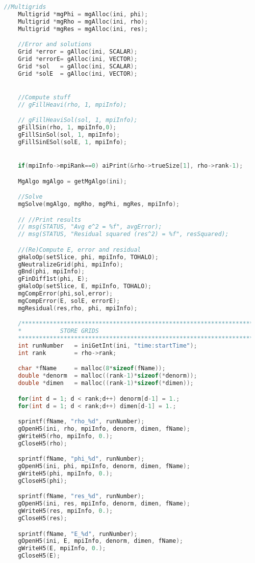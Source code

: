 \begin{lstlisting}[language=c, caption = main routine]
	//Multigrids
	Multigrid *mgPhi = mgAlloc(ini, phi);
	Multigrid *mgRho = mgAlloc(ini, rho);
	Multigrid *mgRes = mgAlloc(ini, res);

	//Error and solutions
	Grid *error = gAlloc(ini, SCALAR);
	Grid *errorE= gAlloc(ini, VECTOR);
	Grid *sol 	= gAlloc(ini, SCALAR);
	Grid *solE	= gAlloc(ini, VECTOR);


	//Compute stuff
	// gFillHeavi(rho, 1, mpiInfo);

	// gFillHeaviSol(sol, 1, mpiInfo);
	gFillSin(rho, 1, mpiInfo,0);
	gFillSinSol(sol, 1, mpiInfo);
	gFillSinESol(solE, 1, mpiInfo);


	if(mpiInfo->mpiRank==0)	aiPrint(&rho->trueSize[1], rho->rank-1);

	MgAlgo mgAlgo = getMgAlgo(ini);

	//Solve
	mgSolve(mgAlgo, mgRho, mgPhi, mgRes, mpiInfo);

	// //Print results
	// msg(STATUS, "Avg e^2 = %f", avgError);
	// msg(STATUS, "Residual squared (res^2) = %f", resSquared);

	//(Re)Compute E, error and residual
	gHaloOp(setSlice, phi, mpiInfo, TOHALO);
	gNeutralizeGrid(phi, mpiInfo);
	gBnd(phi, mpiInfo);
	gFinDiff1st(phi, E);
	gHaloOp(setSlice, E, mpiInfo, TOHALO);
	mgCompError(phi,sol,error);
	mgCompError(E, solE, errorE);
	mgResidual(res,rho, phi, mpiInfo);

	/*********************************************************************
	*			STORE GRIDS
	********************************************************************/
	int runNumber 	= iniGetInt(ini, "time:startTime");
	int rank 		= rho->rank;

	char *fName 	= malloc(8*sizeof(fName));
	double *denorm 	= malloc((rank-1)*sizeof(*denorm));
	double *dimen 	= malloc((rank-1)*sizeof(*dimen));

	for(int d = 1; d < rank;d++) denorm[d-1] = 1.;
	for(int d = 1; d < rank;d++) dimen[d-1] = 1.;

	sprintf(fName, "rho_%d", runNumber);
	gOpenH5(ini, rho, mpiInfo, denorm, dimen, fName);
	gWriteH5(rho, mpiInfo, 0.);
	gCloseH5(rho);

	sprintf(fName, "phi_%d", runNumber);
	gOpenH5(ini, phi, mpiInfo, denorm, dimen, fName);
	gWriteH5(phi, mpiInfo, 0.);
	gCloseH5(phi);

	sprintf(fName, "res_%d", runNumber);
	gOpenH5(ini, res, mpiInfo, denorm, dimen, fName);
	gWriteH5(res, mpiInfo, 0.);
	gCloseH5(res);

	sprintf(fName, "E_%d", runNumber);
	gOpenH5(ini, E, mpiInfo, denorm, dimen, fName);
	gWriteH5(E, mpiInfo, 0.);
	gCloseH5(E);


\end{lstlisting}
